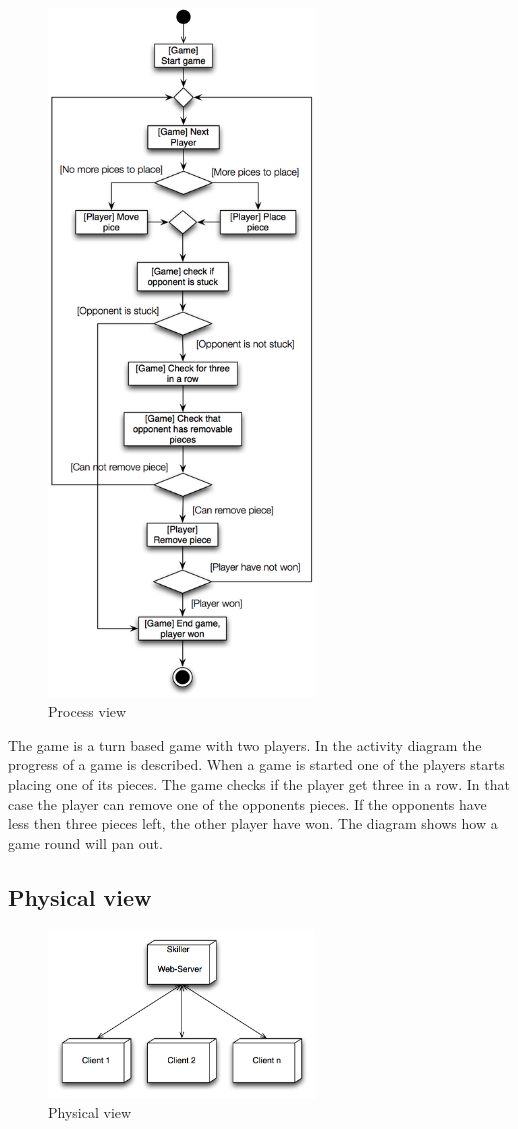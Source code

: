 \begin{figure}[H]
\begin{center}
\includegraphics[width=200pt]{./Images/ProcessView}
\end{center}
\caption{Process view}
\end{figure}

The game is a turn based game with two players. In the activity diagram the progress of a game is described. When a game is started one of the players starts placing one of its pieces. The game checks if the player get three in a row. In that case the player can remove one of the opponents pieces. If the opponents have less then three pieces left, the other player have won. The diagram shows how a game round will pan out. 


\subsection{Physical view}

\begin{figure}[H]
\begin{center}
\includegraphics[width=200pt]{./Images/PhysicalLayer1}
\end{center}
\caption{Physical view}
\end{figure}






